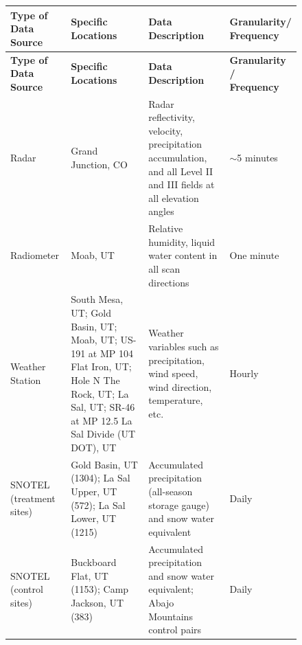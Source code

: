 \documentclass[11pt]{article}
\begin{document}
\begin{figure}[h!]
\centering
\begin{longtable}{|>{\centering\arraybackslash}p{3cm}|
                  >{\centering\arraybackslash}p{4.5cm}|
                  >{\RaggedRight\arraybackslash}p{5.5cm}|
                  >{\centering\arraybackslash}p{2.5cm}|}
\hline
\rowcolor{headerbg}
\makecell[c]{\textbf{Type of} \\ \textbf{Data Source}} &
\makecell[c]{\textbf{Specific} \\ \textbf{Locations}} &
\makecell[c]{\textbf{Data} \\ \textbf{Description}} &
\makecell[c]{\textbf{Granularity/} \\ \textbf{Frequency}} \\
\hline
\endfirsthead

\hline
\rowcolor{headerbg}
\makecell[c]{\textbf{Type of} \\ \textbf{Data Source}} &
\makecell[c]{\textbf{Specific} \\ \textbf{Locations}} &
\makecell[c]{\textbf{Data} \\ \textbf{Description}} &
\makecell[c]{\textbf{Granularity /} \\ \textbf{Frequency}} \\
\hline
\endhead

\hline
\endfoot

Radar &
Grand Junction, CO &
Radar reflectivity, velocity, precipitation accumulation, and all Level II and III fields at all elevation angles &
$\sim$5 minutes \\
\hline

Radiometer &
Moab, UT &
Relative humidity, liquid water content in all scan directions &
One minute \\
\hline

Weather Station &
South Mesa, UT; Gold Basin, UT; Moab, UT; US-191 at MP 104 Flat Iron, UT; Hole N The Rock, UT; La Sal, UT; SR-46 at MP 12.5 La Sal Divide (UT DOT), UT &
Weather variables such as precipitation, wind speed, wind direction, temperature, etc. &
Hourly \\
\hline

SNOTEL
(treatment sites) &
Gold Basin, UT (1304); La Sal Upper, UT (572); La Sal Lower, UT (1215) &
Accumulated precipitation (all-season storage gauge) and snow water equivalent &
Daily \\
\hline

SNOTEL
(control sites) &
Buckboard Flat, UT (1153); Camp Jackson, UT (383) &
Accumulated precipitation and snow water equivalent; Abajo Mountains control pairs &
Daily \\
\hline


\end{longtable}
\end{figure}
\end{document}
